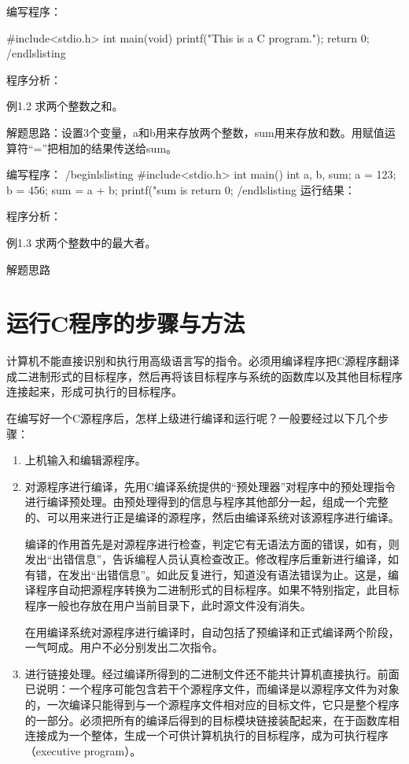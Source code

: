 编写程序：
\begin{lslisting}
#include<stdio.h>
int main(void)
{
	printf("This is a C program.\n");
	return 0;
}
/end{lslisting}

程序分析：

例1.2 求两个整数之和。

解题思路：设置3个变量，a和b用来存放两个整数，sum用来存放和数。用赋值运算符“=”把相加的结果传送给sum。

编写程序：
/begin{lslisting}
#include<stdio.h>
int main()
{
	int a, b, sum;
	a = 123;
	b = 456;
	sum = a + b;
	printf("sum is %
	return 0;
}
/end{lslisting}
运行结果：

程序分析：

例1.3 求两个整数中的最大者。

解题思路

\section{运行C程序的步骤与方法}

 计算机不能直接识别和执行用高级语言写的指令。必须用编译程序把C源程序翻译成二进制形式的目标程序，然后再将该目标程序与系统的函数库以及其他目标程序连接起来，形成可执行的目标程序。

 在编写好一个C源程序后，怎样上级进行编译和运行呢？一般要经过以下几个步骤：

\begin{enumerate}
	\item 	上机输入和编辑源程序。
	\item 对源程序进行编译，先用C编译系统提供的“预处理器”对程序中的预处理指令进行编译预处理。由预处理得到的信息与程序其他部分一起，组成一个完整的、可以用来进行正是编译的源程序，然后由编译系统对该源程序进行编译。

 编译的作用首先是对源程序进行检查，判定它有无语法方面的错误，如有，则发出“出错信息”，告诉编程人员认真检查改正。修改程序后重新进行编译，如有错，在发出“出错信息”。如此反复进行，知道没有语法错误为止。这是，编译程序自动把源程序转换为二进制形式的目标程序。如果不特别指定，此目标程序一般也存放在用户当前目录下，此时源文件没有消失。

 在用编译系统对源程序进行编译时，自动包括了预编译和正式编译两个阶段，一气呵成。用户不必分别发出二次指令。

	\item 进行链接处理。经过编译所得到的二进制文件还不能共计算机直接执行。前面已说明：一个程序可能包含若干个源程序文件，而编译是以源程序文件为对象的，一次编译只能得到与一个源程序文件相对应的目标文件，它只是整个程序的一部分。必须把所有的编译后得到的目标模块链接装配起来，在于函数库相连接成为一个整体，生成一个可供计算机执行的目标程序，成为可执行程序（executive program）。


\end{enumerate}
\end{lslisting}
